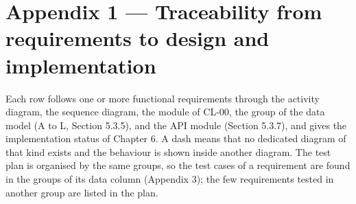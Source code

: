 \newpage
\section*{Appendix 1 --- Traceability from requirements to design and implementation}

Each row follows one or more functional requirements through the activity diagram, the sequence diagram, the module of CL-00, the group of the data model (A to L, Section 5.3.5), and the API module (Section 5.3.7), and gives the implementation status of Chapter 6. A dash means that no dedicated diagram of that kind exists and the behaviour is shown inside another diagram. The test plan is organised by the same groups, so the test cases of a requirement are found in the groups of its data column (Appendix 3); the few requirements tested in another group are listed in the plan.

